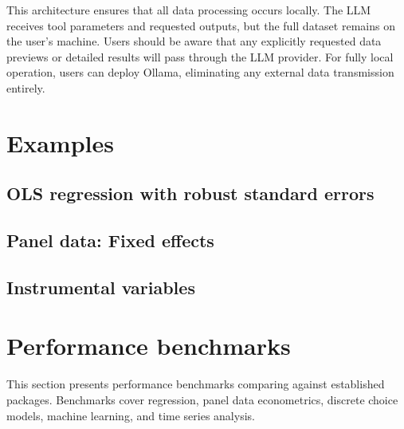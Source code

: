 \documentclass[article]{jss}
\begin{document}
This architecture ensures that all data processing occurs locally.
The LLM receives tool parameters and requested outputs, but the full dataset
remains on the user's machine. Users should be aware that any explicitly
requested data previews or detailed results will pass through the LLM provider.
For fully local operation, users can deploy Ollama, eliminating any external
data transmission entirely.



\section{Examples} \label{sec:examples}


\subsection{OLS regression with robust standard errors}


\subsection{Panel data: Fixed effects}


\subsection{Instrumental variables}




\section{Performance benchmarks} \label{sec:performance}

This section presents performance benchmarks comparing 
against established  packages. Benchmarks cover regression,
panel data econometrics, discrete choice models, machine learning, and time
series analysis.
\end{document}
